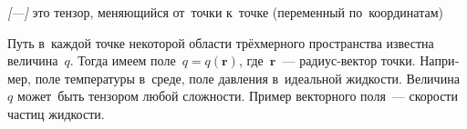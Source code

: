 

\label{para:differentiationoftensorfields}

\begin{otherlanguage}{russian}

\begin{changemargin}{\parindent}{\parindent}
\vspace{-0.15em}
\small \flushright \textit{[---]} это тензор, меняющийся от~точки к~точке (переменный по~координатам)
\par\vspace{.25em}
\end{changemargin}

\noindent Путь в~каждой точке некоторой области трёхмерного пространства
известна величина~$q$. Тогда имеем поле~${q \!=\! q(\bm{r})}$, где~$\bm{r}$~--- радиус\hbox{-}вектор точки. Например, поле температуры в~среде, поле давления в~идеальной жидкости. Величина~$q$ может~быть тензором любой сложности. Пример векторного поля~--- скорости частиц жидкости.

\end{otherlanguage}



